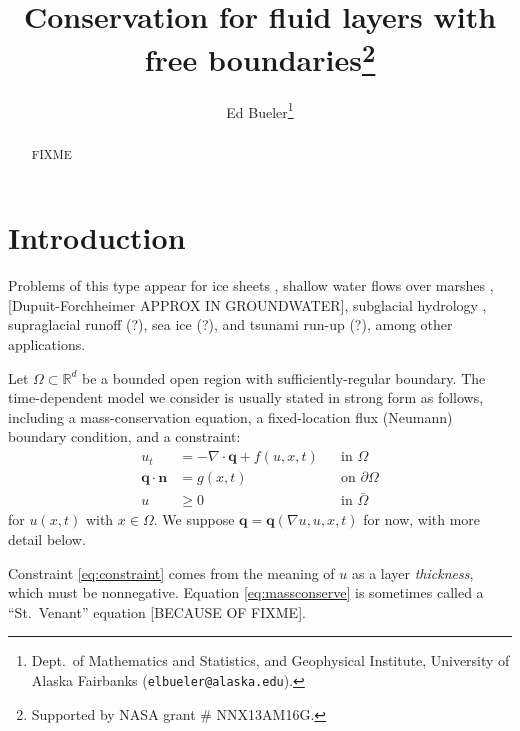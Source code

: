 \documentclass[final,leqno,onefignum,onetabnum]{siamltex1213bueler}
\title{Conservation for fluid layers with free boundaries\thanks{Supported by NASA grant \# NNX13AM16G.}}
\author{Ed Bueler\thanks{Dept.~of Mathematics and Statistics, and Geophysical Institute, University of Alaska Fairbanks (\texttt{elbueler@alaska.edu}).}}
\newcommand\bn{\mathbf{n}}
\newcommand\bq{\mathbf{q}}
\newcommand{\Div}{\nabla\cdot}
\renewcommand{\grad}{\nabla}
\newcommand\RR{\mathbb{R}}
\begin{document}
\maketitle
{}%

\begin{abstract}
FIXME
\end{abstract}




\pagestyle{myheadings}
\thispagestyle{plain}

\section{Introduction}

Problems of this type appear for ice sheets \cite{BLKCB,CDDSV,EgholmNielsen2010,JouvetBueler2012}, shallow water flows over marshes \cite{AlonsoSantillanaDawson}, [Dupuit-Forchheimer APPROX IN GROUNDWATER], subglacial hydrology \cite{AschwandenBuelerKhroulevBlatter,BuelervanPeltDRAFT,Schoofetal2012}, supraglacial runoff (?), sea ice (?), and tsunami run-up (?), among other applications.

Let $\Omega \subset \RR^d$ be a bounded open region with sufficiently-regular boundary.  The time-dependent model we consider is usually stated in strong form as follows, including a mass-conservation equation, a fixed-location flux (Neumann) boundary condition, and a constraint:
\begin{align}
u_t &= - \Div \bq + f(u,x,t) &&\text{in } \Omega \label{eq:massconserve} \\
\bq \cdot \bn &= g(x,t) &&\text{on } \partial\Omega \label{eq:fixedneumann} \\
u &\ge 0 &&\text{in } \bar\Omega \label{eq:constraint}
\end{align}
for $u(x,t)$ with $x\in \Omega$.  We suppose $\bq = \bq(\grad u, u, x, t)$ for now, with more detail below.  

Constraint \eqref{eq:constraint} comes from the meaning of $u$ as a layer \emph{thickness}, which must be nonnegative.  Equation \eqref{eq:massconserve} is sometimes called a ``St.~Venant'' equation [BECAUSE OF FIXME].
\end{document}
